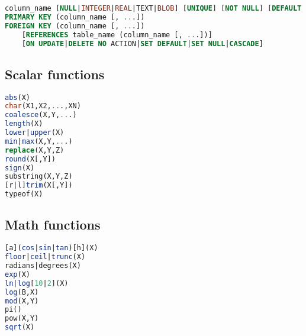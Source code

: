 \documentclass{hibiscus}
\begin{document}
\begin{lstlisting}[language=SQL]
column_name [NULL|INTEGER|REAL|TEXT|BLOB] [UNIQUE] [NOT NULL] [DEFAULT value] [CHECK (condition)]
PRIMARY KEY (column_name [, ...])
FOREIGN KEY (column_name [, ...])
    [REFERENCES table_name (column_name [, ...])]
    [ON UPDATE|DELETE NO ACTION|SET DEFAULT|SET NULL|CASCADE]
\end{lstlisting}

\subsection{Scalar functions}

\begin{lstlisting}[language=SQL]
abs(X)
char(X1,X2,...,XN)
coalesce(X,Y,...)
length(X)
lower|upper(X)
min|max(X,Y,...)
replace(X,Y,Z)
round(X[,Y])
sign(X)
substring(X,Y,Z)
[r|l]trim(X[,Y])
typeof(X)
\end{lstlisting}

\subsection{Math functions}

\begin{lstlisting}[language=SQL]
[a](cos|sin|tan)[h](X)
floor|ceil|trunc(X)
radians|degrees(X)
exp(X)
ln|log[10|2](X)
log(B,X)
mod(X,Y)
pi()
pow(X,Y)
sqrt(X)
\end{lstlisting}
\end{document}
